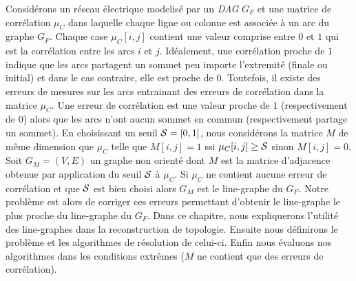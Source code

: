 Consid\'erons un r\'eseau \'electrique modelis\'e par un {\em DAG} $G_F$ et une matrice de corr\'elation $\mu_C$ dans laquelle chaque ligne ou colonne est associ\'ee \`a un arc du graphe $G_F$.
Chaque case $\mu_C[i,j]$ contient une valeur comprise entre $0$ et $1$ qui est la corr\'elation entre les arcs $i$ et $j$. 
Id\'ealement, une corr\'elation proche de $1$ indique que les arcs partagent un sommet peu importe l'extremit\'e (finale ou initial) et dans le cas contraire, elle est proche de $0$. 
Toutefois, il existe des erreurs de mesures sur les arcs entrainant des erreurs de corr\'elation dans la matrice $\mu_C$. Une erreur de corr\'elation est une valeur proche de $1$ (respectivement de $0$) alors que les arcs n'ont aucun sommet en commun (respectivement partage un sommet).
\newline
En choisissant un seuil ${\cal S} = [0,1]$, nous consid\'erons  la matrice $M$ de m\^eme dimension que $\mu_C$ telle que $M[i,j] = 1$ ssi $\mu_C[i,j] \ge {\cal S}$ sinon $M[i,j] = 0$.
\newline
Soit $G_M = (V, E)$ un graphe non orient\'e dont $M$ est la matrice d'adjacence obtenue par application du seuil $\cal S$ \`a $\mu_C$. 
Si   $\mu_C$ ne contient aucune erreur de corr\'elation et que $\cal S$ est bien choisi alors $G_M$ est le line-graphe du $G_F$. Notre probl\`eme est alors de corriger ces erreurs  permettant d'obtenir le line-graphe le plus proche du line-graphe du $G_F$.
\newline
Dans ce chapitre, nous expliquerons l'utilit\'e des line-graphes dans la reconstruction de topologie. Ensuite nous d\'efinirons le probl\`eme et les algorithmes de r\'esolution de celui-ci. Enfin nous \'evaluons nos algorithmes dans les conditions extr\^emes ($M$ ne contient que des erreurs de corr\'elation).